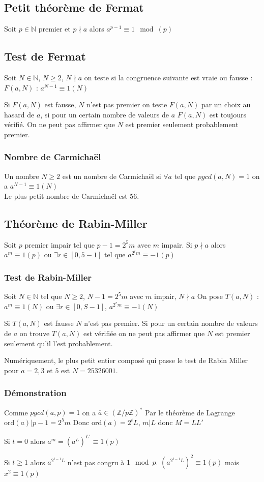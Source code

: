 \documentclass[a4paper,10pt]{book} %
\newcommand{\N}{\mathbb{N}}
\newcommand{\Z}{\mathbb{Z}}
\newcommand{\ord}{\mathrm{ord}}
\begin{document}
\subsection{Petit théorème de Fermat}
Soit $p\in \N$ premier et $p\nmid a$ alors $a^{p-1}\equiv 1\mod (p)$

\subsection{Test de Fermat}
Soit $N\in \N$, $N\geq 2$, $N\nmid a$
on teste si la congruence suivante est vraie ou fausse : $F(a,N)$ : $a^{N-1}\equiv 1(N)$

Si $F(a,N)$ est fausse, $N$ n'est pas premier 
on teste $F(a,N)$ par un choix au hasard de $a$, si pour un certain nombre de valeurs de $a$ $F(a,N)$ est toujours vérifié. On ne peut pas affirmer que $N$ est premier seulement probablement premier.

\subsubsection{Nombre de Carmichaël}
Un nombre $N\geq 2$ est un nombre de Carmichaël si $\forall a$ tel que $pgcd(a,N)=1$ on a $a^{N-1}\equiv 1(N)$\\
Le plus petit nombre de Carmichaël est 56.

\subsection{Théorème de Rabin-Miller}
Soit $p$ premier impair tel que $p-1=2^5m$ avec $m$ impair.
Si $p\nmid a$ alors $a^m\equiv 1(p)$ ou $\exists r\in [0,5-1]$ tel que $a^{2^rm}\equiv -1 (p)$

\subsubsection{Test de Rabin-Miller}
Soit $N\in \N$ tel que $N\geq 2$, $N-1=2^5m$ avec $m$ impair, $N\nmid a$
On pose $T(a,N)$ : $a^m\equiv 1(N)$ ou $\exists r\in [0,S-1]$, $a^{2^rm}\equiv -1 (N)$

Si $T(a,N)$ est fausse $N$ n'est pas premier.
Si pour un certain nombre de valeurs de $a$ on trouve $T(a,N)$ est vérifiée on ne peut pas affirmer que $N$ est premier seulement qu'il l'est probablement.

Numériquement, le plus petit entier composé qui passe le test de Rabin Miller pour $a=2,3$ et $5$ est $N=25326001$.

\subsubsection{Démonstration}
Comme $pgcd(a,p)=1$ on a $\overline{a}\in (\Z/p\Z)^*$
Par le théorème de Lagrange $\ord(a)|p-1=2^5m$
Donc $\ord(a)=2^tL$, $m|L$ donc $M=LL'$

Si $t=0$ alors $a^m=(a^L)^{L'}\equiv 1(p)$

Si $t\geq 1$ alors $a^{2^{t-1}L}$ n'est pas congru à $1 \mod p$.
$(a^{2^{t-1}L})^2\equiv 1(p)$
mais $x^2\equiv 1(p)$
\end{document}
